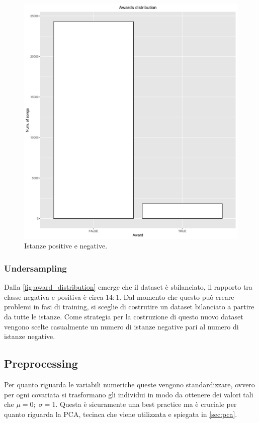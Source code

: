 \begin{figure}[H]
	\centering
	\includegraphics[width=14cm]{../images/awards_distribution.png}
	\caption{Istanze positive e negative.}
	\label{fig:award_distribution}
\end{figure}

\subsubsection{Undersampling}
Dalla \autoref{fig:award_distribution} emerge che il dataset è sbilanciato, il rapporto tra classe negativa e positiva è circa $14:1$. Dal momento che questo può creare problemi in fasi di training, si sceglie di costrutire un dataset bilanciato a partire da tutte le istanze. Come strategia per la costruzione di questo nuovo dataset vengono scelte casualmente un numero di istanze negative pari al numero di istanze negative.

\subsection{Preprocessing}
Per quanto riguarda le variabili numeriche queste vengono standardizzare, ovvero per ogni covariata si trasformano gli individui in modo da ottenere dei valori tali che $\mu = 0;\; \sigma = 1$. Questa è sicuramente una best practice ma è cruciale per quanto riguarda la PCA, tecinca che viene utilizzata e spiegata in \autoref{sec:pca}.

